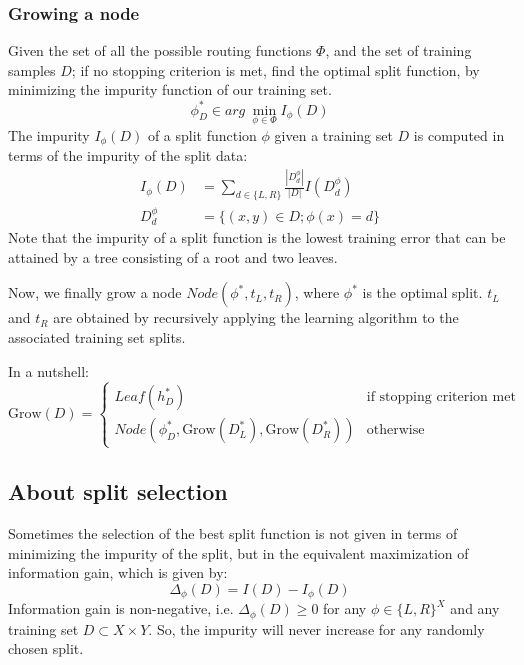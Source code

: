 \subsubsection{Growing a node}
Given the set of all the possible routing functions \(\Phi\), and the set of training samples \(D\); if no stopping criterion is met, find the optimal split function, by minimizing the impurity function of our training set.
\begin{equation}
    \phi_D^* \in arg\ \min_{\phi \in \Phi} I_\phi (D)
\end{equation}
The impurity \(I_\phi(D)\) of a split function \(\phi\) given a training set \(D\) is computed in terms of the impurity of the split data:
\begin{align}
    I_\phi(D) &= \sum_{d \in \{L,R\}} \frac {|D_d^\phi|} {|D|} I(D_d^\phi)\\
    D_d^\phi &= \{(x,y) \in D; \phi(x) = d\}
\end{align}
Note that the impurity of a split function is the lowest training error that can be attained by a tree consisting of a root and two leaves.

Now, we finally grow a node \(Node(\phi^*, t_L, t_R)\), where \(\phi^*\) is the optimal split. \(t_L\) and \(t_R\) are obtained by recursively applying the learning algorithm to the associated training set splits.

In a nutshell:
\begin{equation}
    \text{Grow}(D)=\begin{cases}
        Leaf(h_D^*)                                                &\text{if stopping criterion met}\\
        Node(\phi_D^*, \text{Grow}(D_L^*), \text{Grow}(D_R^*))     &\text{otherwise}
    \end{cases}
\end{equation}

\subsection{About split selection}
Sometimes the selection of the best split function is not given in terms of minimizing the impurity of the split, but in the equivalent maximization of information gain, which is given by:
\begin{equation}
    \Delta_\phi(D)=I(D)-I_\phi(D)
\end{equation}
Information gain is non-negative, i.e. \(\Delta_\phi(D) \geq 0\) for any \(\phi \in \{L,R\}^X\) and any training set \(D \subset X \times Y\). So, the impurity will never increase for any randomly chosen split.

